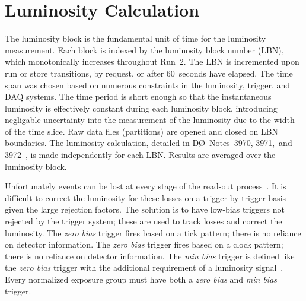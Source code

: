 \documentclass[12pt]{article}
\begin{document}
\section{Luminosity Calculation}

The luminosity block is the fundamental unit of time for the
luminosity measurement.  Each block is indexed by the luminosity block
number (LBN), which monotonically increases throughout Run~2.  The LBN
is incremented upon run or store transitions, by request, or after
60~seconds have elapsed.  The time span was chosen based on numerous
constraints in the luminosity, trigger, and DAQ systems.  The time
period is short enough so that the instantaneous luminosity is
effectively constant during each luminosity block, introducing
negligable uncertainty into the measurement of the luminosity due to
the width of the time slice.  Raw data files (partitions) are opened
and closed on LBN boundaries.  The luminosity calculation, detailed in
D\O~Notes~3970, 3971,~and 3972~\cite{3970,3971,3972}, is made
independently for each LBN.  Results are averaged over the luminosity
block.

Unfortunately events can be lost at every stage of the read-out
process~\cite{3972}.  It is difficult to correct the luminosity for
these losses on a trigger-by-trigger basis given the large rejection
factors.  The solution is to have low-bias triggers not rejected by
the trigger system; these are used to track losses and correct the
luminosity.  The {\it zero bias} trigger fires based on a tick
pattern; there is no reliance on detector information.  The {\it zero
bias} trigger fires based on a clock pattern; there is no reliance on
detector information.  The {\it min bias} trigger is defined like the
{\it zero bias} trigger with the additional requirement of a
luminosity signal~\cite{3973}.  Every normalized exposure group must
have both a {\it zero bias} and {\it min bias} trigger.
\end{document}
